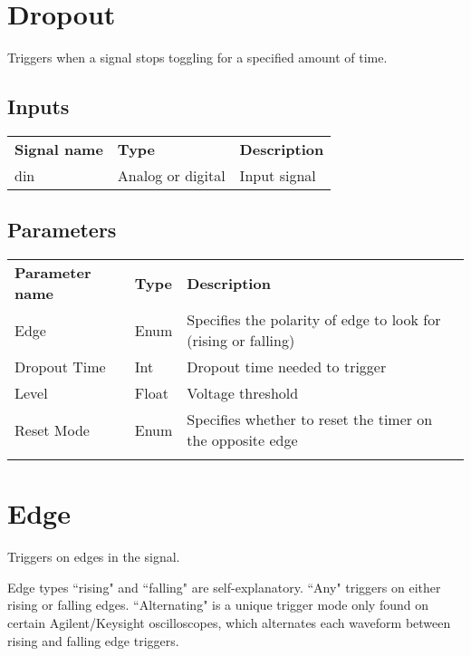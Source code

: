 \pagebreak

\section{Dropout}

Triggers when a signal stops toggling for a specified amount of time.

\subsection{Inputs}

\begin{tabularx}{16cm}{llX}
\thickhline
\textbf{Signal name} & \textbf{Type} & \textbf{Description} \\
\thickhline
din & Analog or digital & Input signal \\
\end{tabularx}

\subsection{Parameters}

\begin{tabularx}{16cm}{llX}
\thickhline
\textbf{Parameter name} & \textbf{Type} & \textbf{Description} \\
\thickhline
Edge & Enum & Specifies the polarity of edge to look for (rising or falling) \\
\thinhline
Dropout Time & Int & Dropout time needed to trigger \\
\thinhline
Level & Float & Voltage threshold\\
\thinhline
Reset Mode & Enum & Specifies whether to reset the timer on the opposite edge \\
\thickhline
\end{tabularx}

\section{Edge}

Triggers on edges in the signal.

Edge types ``rising" and ``falling" are self-explanatory. ``Any" triggers on either rising or falling edges.
``Alternating" is a unique trigger mode only found on certain Agilent/Keysight oscilloscopes, which alternates each
waveform between rising and falling edge triggers.

